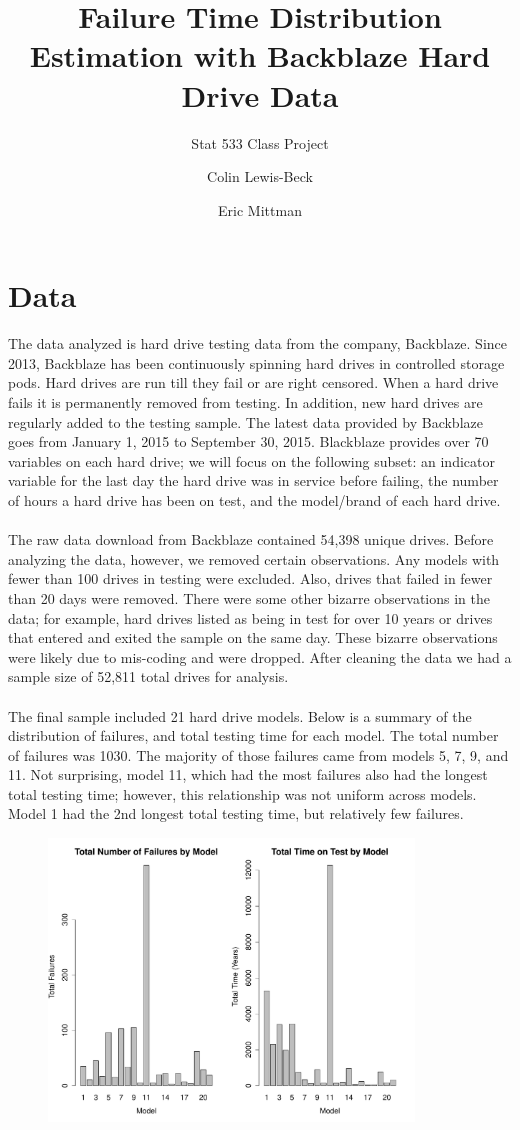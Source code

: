 \documentclass{scrartcl}
\title{Failure Time Distribution Estimation with Backblaze Hard Drive Data}
\subtitle{Stat 533 Class Project}
\author{Colin Lewis-Beck\\
  \and
  Eric Mittman}
\begin{document}
\noindent
\maketitle
\section*{Data}
The data analyzed is hard drive testing data from the company, Backblaze.  Since 2013, Backblaze has been continuously spinning hard drives in controlled storage pods.  Hard drives are run till they fail or are right censored.  When a hard drive fails it is permanently removed from testing.  In addition, new hard drives are regularly added to the testing sample.  The latest data provided by Backblaze goes from January 1, 2015 to September 30, 2015.  Blackblaze provides over 70 variables on each hard drive; we will focus on the following subset: an indicator variable for the last day the hard drive was in service before failing, the number of hours a hard drive has been on test, and the model/brand of each hard drive.\\\\
The raw data download from Backblaze contained 54,398 unique drives.  Before analyzing the data, however, we removed certain observations.  Any models with fewer than 100 drives in testing were excluded.  Also, drives that failed in fewer than 20 days were removed.  There were some other bizarre observations in the data; for example, hard drives listed as being in test for over 10 years or drives that entered and exited the sample on the same day.  These bizarre observations were likely due to mis-coding and were dropped.  After cleaning the data we had a sample size of 52,811 total drives for analysis.\\\\
The final sample included 21 hard drive models.  Below is a summary of the distribution of failures, and total testing time for each model.  The total number of failures was 1030.  The majority of those failures came from models 5, 7, 9, and 11.  Not surprising, model 11, which had the most failures also had the longest total testing time; however, this relationship was not uniform across models.  Model 1 had the 2nd longest total testing time, but relatively few failures.
\begin{figure}[H]
\centering
\includegraphics[height=7.5cm]{sumstat1.pdf}
\end{figure}
\end{document}
